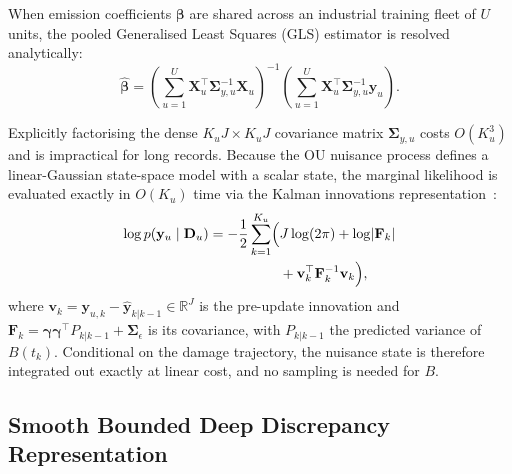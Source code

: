 \documentclass[a4paper,fleqn]{cas-dc}
\newcommand{\R}{\mathbb{R}}
\begin{document}
When emission coefficients $\boldsymbol{\beta}$ are shared across an industrial training fleet of $U$ units, the pooled Generalised Least Squares (GLS) estimator is resolved analytically:
\begin{equation}
    \hat{\boldsymbol{\beta}} = \left(\sum_{u=1}^U \mathbf{X}_u^\top \boldsymbol{\Sigma}_{y,u}^{-1} \mathbf{X}_u\right)^{-1} \left(\sum_{u=1}^U \mathbf{X}_u^\top \boldsymbol{\Sigma}_{y,u}^{-1} \mathbf{y}_u\right).
    \label{eq:gls_solution}
\end{equation}

Explicitly factorising the dense $K_u J \times K_u J$ covariance matrix $\boldsymbol{\Sigma}_{y,u}$ costs $O(K_u^3)$ and is impractical for long records. Because the OU nuisance process defines a linear-Gaussian state-space model with a scalar state, the marginal likelihood is evaluated exactly in $O(K_u)$ time via the Kalman innovations representation~\cite{Marco_2026}:
\begin{equation}
\begin{aligned}
    \log p(\mathbf{y}_u \mid \mathbf{D}_u) = -\frac{1}{2}\sum_{k=1}^{K_u} \Bigl(&J\log(2\pi) + \log\lvert\mathbf{F}_k\rvert\\
    &+ \mathbf{v}_k^\top \mathbf{F}_k^{-1} \mathbf{v}_k\Bigr),
\end{aligned}
    \label{eq:kalman_innovations}
\end{equation}
where $\mathbf{v}_k = \mathbf{y}_{u,k} - \hat{\mathbf{y}}_{k|k-1} \in \R^J$ is the pre-update innovation and $\mathbf{F}_k = \boldsymbol{\gamma}\boldsymbol{\gamma}^\top P_{k|k-1} + \boldsymbol{\Sigma}_\epsilon$ is its covariance, with $P_{k|k-1}$ the predicted variance of $B(t_k)$. Conditional on the damage trajectory, the nuisance state is therefore integrated out exactly at linear cost, and no sampling is needed for $B$.

\subsection{Smooth Bounded Deep Discrepancy Representation}
\label{subsec:deep_discrepancy}
\end{document}
